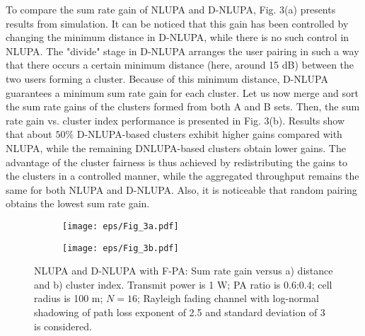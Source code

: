 \documentclass[10pt,final,journal,a4paper,twoside,twocolumn,romanappendices]{IEEEtran}
\theoremstyle{myremark}
\theoremstyle{myremark}
\begin{document}


To compare the sum rate gain of NLUPA and D-NLUPA, Fig. 3(a) presents results from simulation. It can be noticed that this gain has been controlled by {\color{black}changing} the minimum distance in D-NLUPA, while there is no such control in NLUPA. {\color{black}The "divide" stage in D-NLUPA arranges the user pairing in such a way that there occurs a certain minimum distance (here, around 15 dB) between the two users forming a cluster. Because of this minimum distance, D-NLUPA guarantees a minimum sum rate gain for each cluster.} Let us now merge and sort the sum rate gains of the clusters formed from both A and B sets. Then, the sum rate gain vs. cluster index performance is presented in Fig. 3(b). Results show that about $50\%$ D-NLUPA-based clusters exhibit higher gains compared with NLUPA, while the remaining DNLUPA-based clusters obtain lower gains. The advantage of the cluster fairness is thus achieved by redistributing the gains to the clusters in a controlled manner, while the aggregated throughput remains the same for both NLUPA and D-NLUPA. {\color{black}Also, it is noticeable that random pairing obtains the lowest sum rate gain.}



\begin{figure*}
\centering
\begin{subfigure}{0.5\textwidth}
  \centering
  \texttt{[image: eps/Fig\_3a.pdf]}
  \caption{}
  \label{fig:sub1}
\end{subfigure}%
\begin{subfigure}{0.5\textwidth}
  \centering
  \texttt{[image: eps/Fig\_3b.pdf]}
  \caption{}
  \label{fig:sub2}
\end{subfigure}
\caption{{\color{black}NLUPA and D-NLUPA with F-PA: Sum rate gain versus a) distance and b) cluster index. Transmit power is 1 W; PA ratio is 0.6:0.4; cell radius is 100 m; $N=16$; Rayleigh fading channel with log-normal shadowing of path loss exponent of 2.5 and standard deviation of 3 is considered.}}
\label{fig:test}
\end{figure*}

\end{document}
